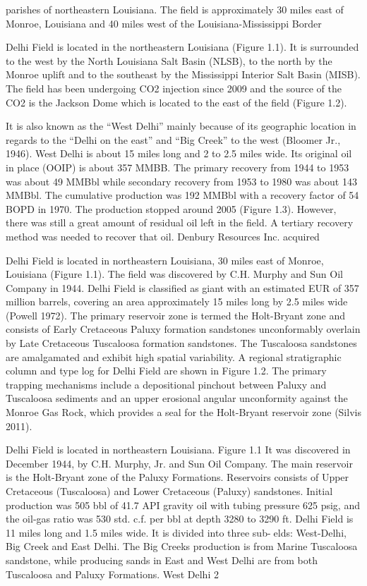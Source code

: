 parishes of northeastern Louisiana. The field is approximately 30 miles east of Monroe,
Louisiana and 40 miles west of the Louisiana-Mississippi Border



Delhi Field is located in the northeastern Louisiana (Figure 1.1). It is surrounded
to the west by the North Louisiana Salt Basin (NLSB), to the north by the Monroe uplift
and to the southeast by the Mississippi Interior Salt Basin (MISB). The field has been
undergoing CO2 injection since 2009 and the source of the CO2 is the Jackson Dome
which is located to the east of the field (Figure 1.2).

It
is also known as the “West Delhi” mainly because of its geographic location in regards to
the “Delhi on the east” and “Big Creek” to the west (Bloomer Jr., 1946). West Delhi is
about 15 miles long and 2 to 2.5 miles wide. Its original oil in place (OOIP) is about 357
MMBB. The primary recovery from 1944 to 1953 was about 49 MMBbl while secondary
recovery from 1953 to 1980 was about 143 MMBbl. The cumulative production was 192
MMBbl with a recovery factor of 54%
BOPD in 1970. The production stopped around 2005 (Figure 1.3). However, there was
still a great amount of residual oil left in the field. A tertiary recovery method was needed
to recover that oil.
Denbury Resources Inc. acquired


Delhi Field is located in northeastern Louisiana, 30 miles east of Monroe, Louisiana
 (Figure 1.1). The field was discovered by C.H. Murphy and Sun Oil Company in 1944.
 Delhi Field is classified as giant with an estimated EUR of 357 million barrels, 
covering an area approximately 15 miles long by 2.5 miles wide (Powell 1972). The 
primary reservoir zone is termed the Holt-Bryant zone and consists of Early Cretaceous
 Paluxy formation sandstones unconformably overlain by Late Cretaceous Tuscaloosa 
formation sandstones. The Tuscaloosa sandstones are amalgamated and exhibit high spatial
 variability. A regional stratigraphic column and type log for Delhi Field are shown in
 Figure 1.2. The primary trapping mechanisms include a depositional pinchout between Paluxy
 and Tuscaloosa sediments and an upper erosional angular unconformity against the Monroe Gas
 Rock, which provides a seal for the Holt-Bryant reservoir zone (Silvis 2011).


Delhi Field is located in northeastern Louisiana. Figure 1.1 It was discovered in
December 1944, by C.H. Murphy, Jr. and Sun Oil Company. The main reservoir is the
Holt-Bryant zone of the Paluxy Formations. Reservoirs consists of Upper Cretaceous
(Tuscaloosa) and Lower Cretaceous (Paluxy) sandstones. Initial production was 505
bbl of 41.7 API gravity oil with tubing pressure 625 psig, and the oil-gas ratio was 530
std. c.f. per bbl at depth 3280 to 3290 ft. Delhi Field is 11 miles long and 1.5 miles
wide. It is divided into three sub-elds: West-Delhi, Big Creek and East Delhi. The
Big Creeks production is from Marine Tuscaloosa sandstone, while producing sands
in East and West Delhi are from both Tuscaloosa and Paluxy Formations. West Delhi
2


